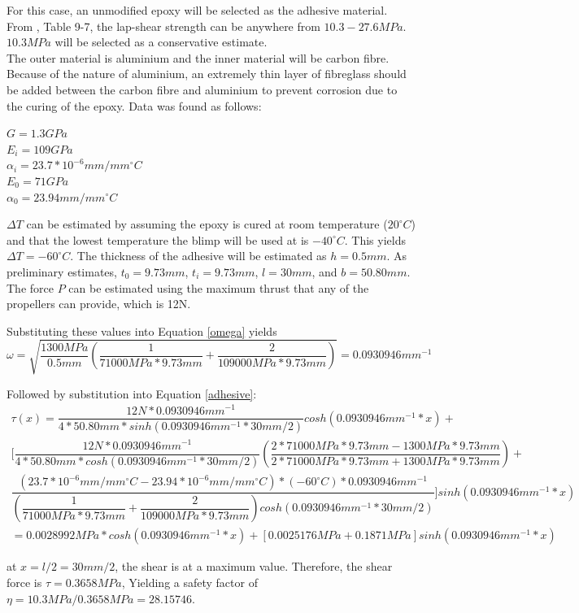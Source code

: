 \documentclass[../main.tex]{subfiles}
\begin{document}
For this case, an unmodified epoxy will be selected as the adhesive material. From \cite{shigley}, Table 9-7, the lap-shear strength can be anywhere from $10.3-27.6MPa$. $10.3 MPa$ will be selected as a conservative estimate.\\

The outer material is aluminium and the inner material will be carbon fibre. Because of the nature of aluminium, an extremely thin layer of fibreglass should be added between the carbon fibre and aluminium to prevent corrosion due to the curing of the epoxy. Data was found as follows:

\begin{center}
$G=1.3 GPa$ \cite{epoxyShear}\\
$E_i=109GPa$ \cite{carbonFibre}\\
$\alpha _i=23.7*10^{-6}mm/mm^{\circ}C$ \cite{carbonFibre}\\
$E_0=71GPa$ \cite{shigley}\\
$\alpha _0=23.94 mm/mm^{\circ}C$ \cite{shigley}\\
\end{center}

$\Delta T$ can be estimated by assuming the epoxy is cured at room temperature ($20 ^{\circ}C$) and that the lowest temperature the blimp will be used at is  $-40 ^{\circ}C$. This yields $\Delta T = -60^{\circ}C$. The thickness of the adhesive will be estimated as $h=0.5mm$. As preliminary estimates, $t_0= 9.73mm$, $t_i= 9.73mm$, $l=30mm$, and $b=50.80mm$. The force $P$ can be estimated using the maximum thrust that any of the propellers can provide, which is 12N.

Substituting these values into Equation \ref{omega} yields
\begin{equation} \label{omegaSolve}
\omega = \sqrt{\dfrac{1300 MPa}{0.5mm}\left(\dfrac{1}{71000MPa*9.73mm}+\dfrac{2}{109000 MPa*9.73mm}\right)} = 0.0930946mm^{-1}
\end{equation}

Followed by substitution into Equation \ref{adhesive}:
\begin{multline} \label{adhesiveSolve}
\tau (x) = \dfrac{12N*0.0930946mm^{-1}}{4*50.80mm*sinh(0.0930946mm^{-1}* 30mm/2)}cosh(0.0930946mm^{-1}* x) + \\ \Bigg[\dfrac{12N*0.0930946mm^{-1}}{4*50.80mm*cosh(0.0930946mm^{-1}* 30mm/2)}\left(\dfrac{2*71000 MPa*9.73mm-1300MPa*9.73mm}{2*71000 MPa*9.73mm+1300MPa*9.73mm}\right)+ \\ \dfrac{(23.7*10^{-6}mm/mm^{\circ}C-23.94*10^{-6} mm/mm^{\circ}C)*(-60^{\circ}C)*0.0930946mm^{-1}}{\left(\dfrac{1}{71000MPa*9.73mm}+\dfrac{2}{109000 MPa*9.73mm}\right)cosh(0.0930946mm^{-1}* 30mm/2)}\Bigg] sinh(0.0930946mm^{-1}* x) \\ = 0.0028992MPa*cosh(0.0930946mm^{-1}* x) + [0.0025176MPa + 0.1871 MPa]sinh(0.0930946mm^{-1}* x)
\end{multline}

at $x = l/2 = 30mm/2$, the shear is at a maximum value. Therefore, the shear force is $\tau = 0.3658 MPa$, Yielding a safety factor of $\eta = 10.3MPa/0.3658MPa = 28.15746$.
\end{document}
